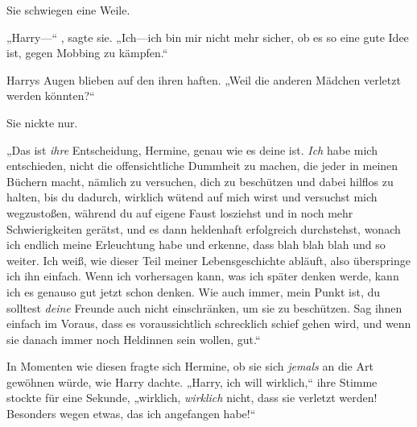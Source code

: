 Sie schwiegen eine Weile.

„Harry—“ , sagte sie. „Ich—ich bin mir nicht mehr sicher, ob es so eine gute Idee ist, gegen Mobbing zu kämpfen.“

Harrys Augen blieben auf den ihren haften. „Weil die anderen Mädchen verletzt werden könnten?“

Sie nickte nur.

„Das ist \emph{ihre} Entscheidung, Hermine, genau wie es deine ist. \emph{Ich} habe mich entschieden, nicht die offensichtliche Dummheit zu machen, die jeder in meinen Büchern macht, nämlich zu versuchen, dich zu beschützen und dabei hilflos zu halten, bis du dadurch, wirklich wütend auf mich wirst und versuchst mich wegzustoßen, während du auf eigene Faust losziehst und in noch mehr Schwierigkeiten gerätst, und es dann heldenhaft erfolgreich durchstehst, wonach ich endlich meine Erleuchtung habe und erkenne, dass blah blah blah und so weiter. Ich weiß, wie dieser Teil meiner Lebensgeschichte abläuft, also überspringe ich ihn einfach. Wenn ich vorhersagen kann, was ich später denken werde, kann ich es genauso gut jetzt schon denken. Wie auch immer, mein Punkt ist, du solltest \emph{deine} Freunde auch nicht einschränken, um sie zu beschützen. Sag ihnen einfach im Voraus, dass es voraussichtlich schrecklich schief gehen wird, und wenn sie danach immer noch Heldinnen sein wollen, gut.“

In Momenten wie diesen fragte sich Hermine, ob sie sich \emph{jemals} an die Art gewöhnen würde, wie Harry dachte. „Harry, ich will wirklich,“ ihre Stimme stockte für eine Sekunde, „wirklich, \emph{wirklich} nicht, dass sie verletzt werden! Besonders wegen etwas, das ich angefangen habe!“


